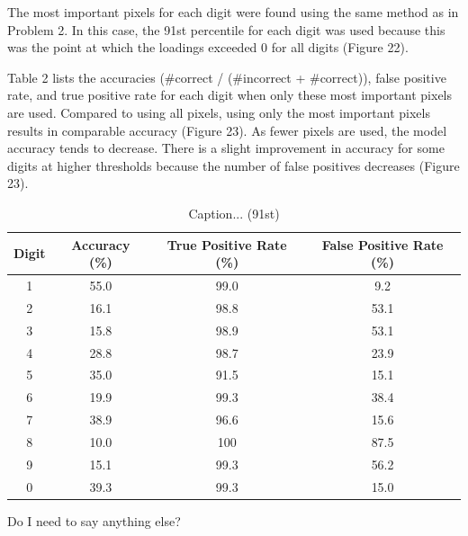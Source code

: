 \documentclass[10pt]{article}
\begin{document}
The most important pixels for each digit were found using the same method as in Problem 2. In this case, the 91st percentile for each digit was used because this was the point at which the loadings exceeded 0 for all digits (Figure 22). %

Table 2 lists the accuracies (\#correct / (\#incorrect + \#correct)), false positive rate, and true positive rate for each digit when only these most important pixels are used. Compared to using all pixels, using only the most important pixels results in comparable accuracy (Figure 23). As fewer pixels are used, the model accuracy tends to decrease. There is a slight improvement in accuracy for some digits at higher thresholds because the number of false positives decreases (Figure 23). %

\begin{table}[ht]
\caption{Caption... (91st)}
\label{table2}
\begin{tabular}{|c|c|c|c|}
\hline
Digit & Accuracy (\%) & True Positive Rate (\%) & False Positive Rate (\%) \\ \hline
1     & 55.0          & 99.0                    & 9.2                      \\ \hline
2     & 16.1          & 98.8                    & 53.1                     \\ \hline
3     & 15.8          & 98.9                    & 53.1                     \\ \hline
4     & 28.8          & 98.7                    & 23.9                     \\ \hline
5     & 35.0          & 91.5                    & 15.1                     \\ \hline
6     & 19.9          & 99.3                    & 38.4                     \\ \hline
7     & 38.9          & 96.6                    & 15.6                     \\ \hline
8     & 10.0          & 100                     & 87.5                     \\ \hline
9     & 15.1          & 99.3                    & 56.2                     \\ \hline
0     & 39.3          & 99.3                    & 15.0                     \\ \hline
\end{tabular}
\end{table}

{\color{red} Do I need to say anything else?}
\end{document}
